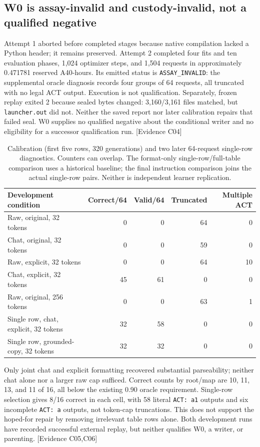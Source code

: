 \documentclass[11pt]{article}
\newcommand{\ev}[1]{\textsf{[Evidence #1]}}
\begin{document}
\subsection{W0 is assay-invalid and custody-invalid, not a qualified negative}
Attempt 1 aborted before completed stages because native compilation lacked a
Python header; it remains preserved. Attempt 2 completed four fits and ten
evaluation phases, 1,024 optimizer steps, and 1,504 requests in approximately
0.471781 reserved A40-hours. Its emitted status is \texttt{ASSAY\_INVALID}:
the supplemental oracle diagnosis records four groups of 64 requests, all
truncated with no legal ACT output. Execution is not qualification. Separately,
frozen replay exited 2 because sealed bytes changed: 3,160/3,161 files matched,
but \texttt{launcher.out} did not. Neither the saved report nor later calibration
repairs that failed seal. W0 supplies no qualified negative about the conditional
writer and no eligibility for a successor qualification run. \ev{C04}

\begin{table}[htbp]
\centering\small
\begin{tabular}{lrrrr}
\toprule
Development condition & Correct/64 & Valid/64 & Truncated & Multiple ACT \\
\midrule
Raw, original, 32 tokens & 0 & 0 & 64 & 0 \\
Chat, original, 32 tokens & 0 & 0 & 59 & 0 \\
Raw, explicit, 32 tokens & 0 & 0 & 64 & 10 \\
Chat, explicit, 32 tokens & 45 & 61 & 0 & 0 \\
Raw, original, 256 tokens & 0 & 0 & 63 & 1 \\
Single row, chat, explicit, 32 tokens & 32 & 58 & 0 & 0 \\
Single row, grounded-copy, 32 tokens & 32 & 32 & 0 & 0 \\
\bottomrule
\end{tabular}
\caption{Calibration (first five rows, 320 generations) and two later 64-request
single-row diagnostics. Counters can overlap. The format-only single-row/full-table
comparison uses a historical baseline; the final instruction comparison joins
the actual single-row pairs. Neither is independent learner replication.}
\label{tab:oracle}
\end{table}

Only joint chat and explicit formatting recovered substantial parseability;
neither chat alone nor a larger raw cap sufficed. Correct counts by root/map are
10, 11, 13, and 11 of 16, all below the existing 0.90 oracle requirement. Single-row
selection gives 8/16 correct in each cell, with 58 literal \texttt{ACT: a1}
outputs and six incomplete \texttt{ACT: a} outputs, not token-cap truncations.
This does not support the hoped-for repair by removing irrelevant table rows
alone. Both development runs have recorded successful external replay, but
neither qualifies W0, a writer, or parenting. \ev{C05,C06}
\end{document}
